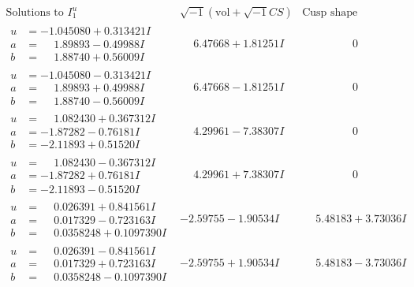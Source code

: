 \documentclass[1p]{elsarticle_modified}
\theoremstyle{definition}
\newcommand{\I}{\sqrt{-1}}
\begin{document}
$$\begin{array}{c|c|c}  
\text{Solutions to }I^u_{1}& \I (\text{vol} + \sqrt{-1}CS) & \text{Cusp shape}\\
 \hline 
\begin{aligned}
u &= -1.045080 + 0.313421 I \\
a &= \phantom{-}1.89893 - 0.49988 I \\
b &= \phantom{-}1.88740 + 0.56009 I\end{aligned}
 & \phantom{-}6.47668 + 1.81251 I & \phantom{-0.000000 } 0 \\ \hline\begin{aligned}
u &= -1.045080 - 0.313421 I \\
a &= \phantom{-}1.89893 + 0.49988 I \\
b &= \phantom{-}1.88740 - 0.56009 I\end{aligned}
 & \phantom{-}6.47668 - 1.81251 I & \phantom{-0.000000 } 0 \\ \hline\begin{aligned}
u &= \phantom{-}1.082430 + 0.367312 I \\
a &= -1.87282 - 0.76181 I \\
b &= -2.11893 + 0.51520 I\end{aligned}
 & \phantom{-}4.29961 - 7.38307 I & \phantom{-0.000000 } 0 \\ \hline\begin{aligned}
u &= \phantom{-}1.082430 - 0.367312 I \\
a &= -1.87282 + 0.76181 I \\
b &= -2.11893 - 0.51520 I\end{aligned}
 & \phantom{-}4.29961 + 7.38307 I & \phantom{-0.000000 } 0 \\ \hline\begin{aligned}
u &= \phantom{-}0.026391 + 0.841561 I \\
a &= \phantom{-}0.017329 - 0.723163 I \\
b &= \phantom{-}0.0358248 + 0.1097390 I\end{aligned}
 & -2.59755 - 1.90534 I & \phantom{-}5.48183 + 3.73036 I \\ \hline\begin{aligned}
u &= \phantom{-}0.026391 - 0.841561 I \\
a &= \phantom{-}0.017329 + 0.723163 I \\
b &= \phantom{-}0.0358248 - 0.1097390 I\end{aligned}
 & -2.59755 + 1.90534 I & \phantom{-}5.48183 - 3.73036 I \\ \hline\begin{aligned}

\end{aligned}
\end{array}$$
\end{document}
